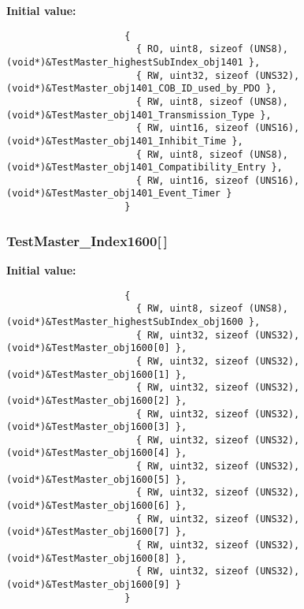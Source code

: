 \textbf{Initial value:}

\begin{Code}\begin{verbatim} 
                     {
                       { RO, uint8, sizeof (UNS8), (void*)&TestMaster_highestSubIndex_obj1401 },
                       { RW, uint32, sizeof (UNS32), (void*)&TestMaster_obj1401_COB_ID_used_by_PDO },
                       { RW, uint8, sizeof (UNS8), (void*)&TestMaster_obj1401_Transmission_Type },
                       { RW, uint16, sizeof (UNS16), (void*)&TestMaster_obj1401_Inhibit_Time },
                       { RW, uint8, sizeof (UNS8), (void*)&TestMaster_obj1401_Compatibility_Entry },
                       { RW, uint16, sizeof (UNS16), (void*)&TestMaster_obj1401_Event_Timer }
                     }
\end{verbatim}\end{Code}
\subsubsection{ {\bf Test\-Master\_\-Index1600}[$\,$]}\label{TestMasterSlave_2TestMaster_8c_6ce5637d61d70f45288c5cb4477af15d}


\textbf{Initial value:}

\begin{Code}\begin{verbatim} 
                     {
                       { RW, uint8, sizeof (UNS8), (void*)&TestMaster_highestSubIndex_obj1600 },
                       { RW, uint32, sizeof (UNS32), (void*)&TestMaster_obj1600[0] },
                       { RW, uint32, sizeof (UNS32), (void*)&TestMaster_obj1600[1] },
                       { RW, uint32, sizeof (UNS32), (void*)&TestMaster_obj1600[2] },
                       { RW, uint32, sizeof (UNS32), (void*)&TestMaster_obj1600[3] },
                       { RW, uint32, sizeof (UNS32), (void*)&TestMaster_obj1600[4] },
                       { RW, uint32, sizeof (UNS32), (void*)&TestMaster_obj1600[5] },
                       { RW, uint32, sizeof (UNS32), (void*)&TestMaster_obj1600[6] },
                       { RW, uint32, sizeof (UNS32), (void*)&TestMaster_obj1600[7] },
                       { RW, uint32, sizeof (UNS32), (void*)&TestMaster_obj1600[8] },
                       { RW, uint32, sizeof (UNS32), (void*)&TestMaster_obj1600[9] }
                     }
\end{verbatim}\end{Code}
